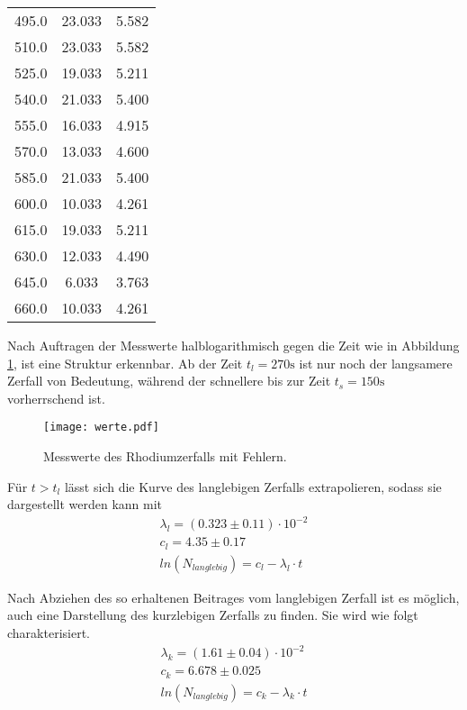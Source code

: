 \begin{table}
\begin{tabular}{c c c}
  495.0  & 23.033  & 5.582  \\
  510.0  & 23.033  & 5.582  \\
  525.0  & 19.033  & 5.211  \\
  540.0  & 21.033  & 5.400  \\
  555.0  & 16.033  & 4.915  \\
  570.0  & 13.033  & 4.600  \\
  585.0  & 21.033  & 5.400  \\
  600.0  & 10.033  & 4.261  \\
  615.0  & 19.033  & 5.211  \\
  630.0  & 12.033  & 4.490  \\
  645.0  & 6.033   & 3.763  \\
  660.0  & 10.033  & 4.261 \\
  \bottomrule
 \end{tabular}
\end{table}

\noindent Nach Auftragen der Messwerte halblogarithmisch gegen die Zeit wie in Abbildung \ref{fig:messf},
ist eine Struktur erkennbar. Ab der Zeit $t_l = 270 \si{\s}$ ist nur noch der langsamere Zerfall
von Bedeutung, während der schnellere bis zur Zeit $t_s = 150 \si{\s}$ vorherrschend ist.

\begin{figure}
 \centering
 \texttt{[image: werte.pdf]}
 \caption{Messwerte des Rhodiumzerfalls mit Fehlern.}
 \label{fig:messf}
\end{figure}

\noindent Für $t > t_l$ lässt sich die Kurve des langlebigen Zerfalls extrapolieren, sodass 
sie dargestellt werden kann mit
\begin{align}
    \lambda_l = (0.323 \pm 0.11) \cdot 10^{-2}\\
    c_l = 4.35 \pm 0.17 \\
    ln(N_{langlebig}) = c_l - \lambda_l \cdot t
\end{align}

Nach Abziehen des so erhaltenen Beitrages vom langlebigen Zerfall ist es möglich, auch
eine Darstellung des kurzlebigen Zerfalls zu finden. Sie wird wie folgt charakterisiert.
\begin{align}
    \lambda_k = (1.61 \pm 0.04) \cdot 10^{-2}\\
    c_k = 6.678 \pm 0.025 \\
    ln(N_{langlebig}) = c_k - \lambda_k \cdot t
\end{align}

